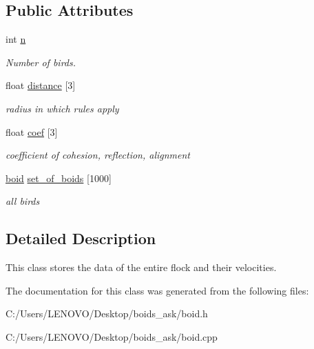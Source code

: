 \subsection*{Public Attributes}
\begin{DoxyCompactItemize}
\item 
\mbox{\label{classflock_a59c42af43982fa5a4e709d6966de95ed}} 
int \mbox{\hyperlink{classflock_a59c42af43982fa5a4e709d6966de95ed}{n}}
\begin{DoxyCompactList}\small\item\em Number of birds. \end{DoxyCompactList}\item 
\mbox{\label{classflock_a00510c8b112d186bd346b28c164b6849}} 
float \mbox{\hyperlink{classflock_a00510c8b112d186bd346b28c164b6849}{distance}} \mbox{[}3\mbox{]}
\begin{DoxyCompactList}\small\item\em radius in which rules apply \end{DoxyCompactList}\item 
\mbox{\label{classflock_a980d67f4d60ba0628542dc60d8124cea}} 
float \mbox{\hyperlink{classflock_a980d67f4d60ba0628542dc60d8124cea}{coef}} \mbox{[}3\mbox{]}
\begin{DoxyCompactList}\small\item\em coefficient of cohesion, reflection, alignment \end{DoxyCompactList}\item 
\mbox{\label{classflock_aa007282c2d3219b8c6bb4eb8555e2829}} 
\mbox{\hyperlink{classboid}{boid}} \mbox{\hyperlink{classflock_aa007282c2d3219b8c6bb4eb8555e2829}{set\+\_\+of\+\_\+boids}} \mbox{[}1000\mbox{]}
\begin{DoxyCompactList}\small\item\em all birds \end{DoxyCompactList}\end{DoxyCompactItemize}


\subsection{Detailed Description}
This class stores the data of the entire flock and their velocities. 

The documentation for this class was generated from the following files\+:\begin{DoxyCompactItemize}
\item 
C\+:/\+Users/\+L\+E\+N\+O\+V\+O/\+Desktop/boids\+\_\+ask/boid.\+h\item 
C\+:/\+Users/\+L\+E\+N\+O\+V\+O/\+Desktop/boids\+\_\+ask/boid.\+cpp\end{DoxyCompactItemize}
